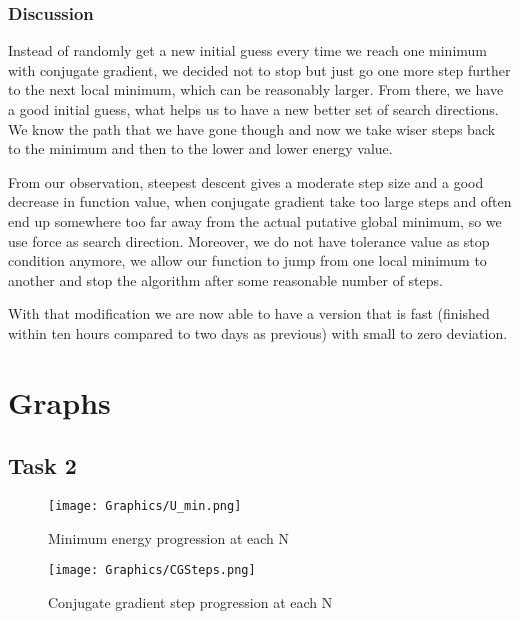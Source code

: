 \documentclass{scrartcl}
\begin{document}
\subsubsection{Discussion}
\par Instead of randomly get a new initial guess every time we reach one minimum with conjugate gradient, we decided not to stop but just go one more step further to the next local minimum, which can be reasonably larger. From there, we have a good initial guess, what helps us to have a new better set of search directions. We know the path that we have gone though and now we take wiser steps back to the minimum and then to the lower and lower energy value. \par
From our observation, steepest descent gives a moderate step size and a good decrease in function value, when conjugate gradient take too large steps and often end up somewhere too far away from the actual putative global minimum, so we use force as search direction. Moreover, we do not have tolerance value as stop condition anymore, we allow our function to jump from one local minimum to another and stop the algorithm after some reasonable number of steps.
\par With that modification we are now able to have a version that is fast (finished within ten hours compared to two days as previous) with small to zero deviation. \\

\newpage
\section{Graphs} \label{sec:Graphs}
    \subsection{Task 2}
    
    \begin{figure}[h!]
        \centering
        \texttt{[image: Graphics/U\_min.png]}
        \caption{Minimum energy progression at each N}
        \label{fig:my_label 2}
    \end{figure}

    \begin{figure}[h!]
        \centering
        \texttt{[image: Graphics/CGSteps.png]}
        \caption{Conjugate gradient step progression at each N}
        \label{fig:my_label 3}
    \end{figure}

\newpage
\end{document}
